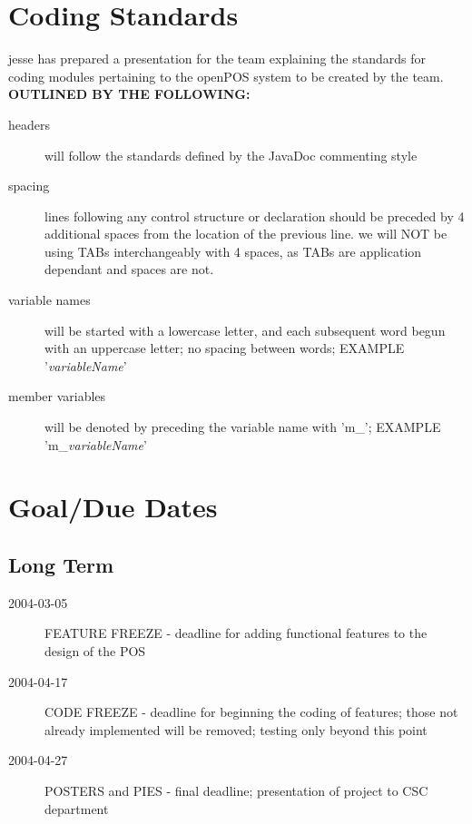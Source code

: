 \documentclass{article}
\begin{document}
\section{Coding Standards}
jesse has prepared a presentation for the team explaining the
standards for coding modules pertaining to the openPOS system to
be created by the team. \\{\bf OUTLINED BY THE FOLLOWING:}

\begin{description}
    \item[headers] will follow the standards defined by the JavaDoc commenting style
    \item[spacing] lines following any control structure or declaration should be preceded by 4 additional spaces from the location of the previous line.  we will NOT be using TABs interchangeably with 4 spaces, as TABs are application dependant and spaces are not.
    \item[variable names] will be started with a lowercase letter, and each subsequent word begun with an uppercase letter; no spacing between words; EXAMPLE '{\it variableName}'
    \item[member variables] will be denoted by preceding the variable name with 'm\_'; EXAMPLE 'm\_{\it variableName}'
\end{description}

\section{Goal/Due Dates}
\subsection{Long Term}

\begin{description}
    \item[2004-03-05] FEATURE FREEZE - deadline for adding functional features to the design of the POS
    \item[2004-04-17] CODE FREEZE - deadline for beginning the coding of features; those not already implemented will be removed; testing only beyond this point
    \item[2004-04-27] POSTERS and PIES - final deadline; presentation of project to CSC department
\end{description}
\end{document}
